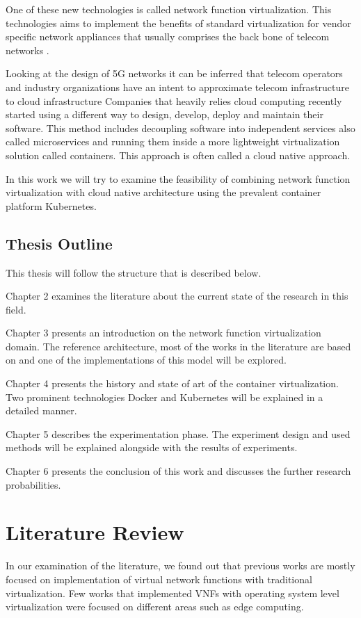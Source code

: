 \documentclass[12pt,oneandhalf,chaparabic,ceng,ms,eng,oneside,pntc]{gsufbe}
\begin{document}
One of these new technologies is called network function virtualization.  This technologies aims to
implement the benefits of standard virtualization for vendor specific network appliances that usually
comprises the back bone of telecom networks \cite{abdelwahab_network_2016}.

Looking at the design of 5G networks it can be inferred that telecom operators and industry organizations
have an intent to approximate telecom infrastructure to cloud infrastructure  Companies that heavily
relies cloud computing recently started using a different way to design, develop, deploy and maintain
their software.  This method includes decoupling software into independent services also called 
microservices and running them inside a more lightweight virtualization solution called containers. 
This approach is often called a cloud native approach.

In this work we will try to examine the feasibility of combining network function virtualization with
cloud native architecture using the prevalent container platform Kubernetes.

\section{Thesis Outline}
This thesis will follow the structure that is described below.

Chapter 2 examines the literature about the current state of the research in this field. 

Chapter 3 presents an introduction on the network function virtualization domain.  The reference
architecture, most of the works in the literature are based on and one of the implementations of this
model will be explored.

Chapter 4 presents the history and state of art of the container virtualization.  Two prominent
technologies Docker and Kubernetes will be explained in a detailed manner.

Chapter 5 describes the experimentation phase.  The experiment design and used methods will be explained
alongside with the results of experiments.

Chapter 6 presents the conclusion of this work and discusses the further research probabilities.

\chapter{Literature Review}
In our examination of the literature, we found out that previous works are mostly focused on
implementation of virtual network functions with traditional virtualization.  Few works that implemented
VNFs with operating system level virtualization were focused on different areas such as edge 
computing.
\end{document}

